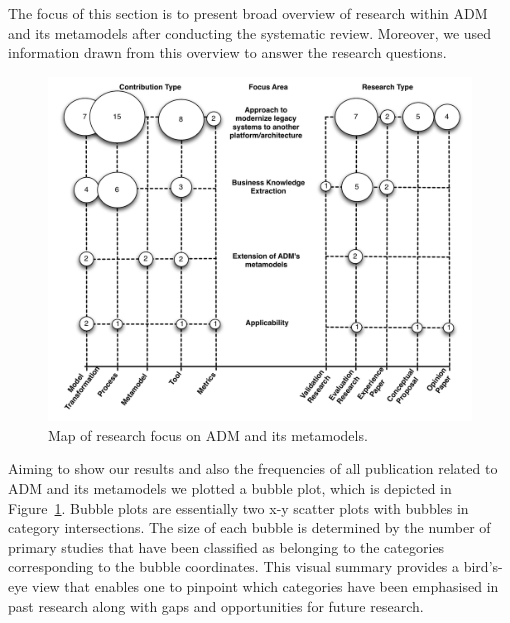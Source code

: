 

The focus of this section is to present broad overview of research within ADM and its metamodels after conducting the systematic review. Moreover, we used information drawn from this overview to answer the research questions. 
\begin{figure}[t]
\centering
  \includegraphics[scale=0.5]{figuras/Mapa_ESELAW_2014}
\caption{Map of research focus on ADM and its metamodels.}
\label{map}
\end{figure} 
Aiming to show our results and also the frequencies of all publication related to ADM and its metamodels we plotted a bubble plot, which is depicted in Figure~\ref{map}. Bubble plots are essentially two x-y scatter plots with bubbles in category intersections. The size of each bubble is determined by the number of primary studies that have been classified as belonging to the categories corresponding to the bubble coordinates. This visual summary provides a bird's-eye view that enables one to pinpoint which categories have been emphasised in past research along with gaps and opportunities for future research.

